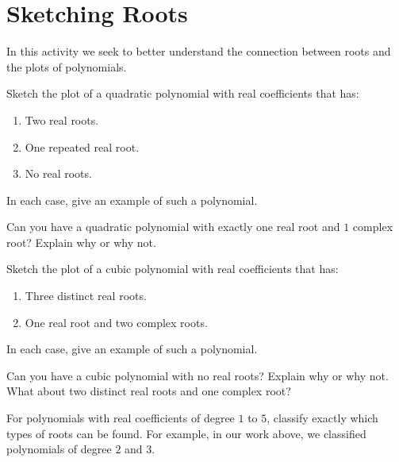 \newpage
\section{Sketching Roots}\label{A:sketchRoots}

In this activity we seek to better understand the connection between
roots and the plots of polynomials.

\begin{prob}
Sketch the plot of a quadratic polynomial with real coefficients that has:
\begin{enumerate}
\item Two real roots.
\item One repeated real root.
\item No real roots.
\end{enumerate}
In each case, give an example of such a polynomial.
\end{prob}

\begin{prob}
Can you have a quadratic polynomial with exactly one real root and
$1$ complex root?  Explain why or why not.
\end{prob}


\begin{prob}
Sketch the plot of a cubic polynomial with real coefficients that has:
\begin{enumerate}
\item Three distinct real roots.
\item One real root and two complex roots.
\end{enumerate}
In each case, give an example of such a polynomial.
\end{prob}

\begin{prob}
Can you have a cubic polynomial with no real roots?  Explain why or
why not. What about two distinct real roots and one complex root?
\end{prob}


\begin{prob}
For polynomials with real coefficients of degree $1$ to $5$, classify
exactly which types of roots can be found. For example, in our work
above, we classified polynomials of degree $2$ and $3$.
\end{prob}
